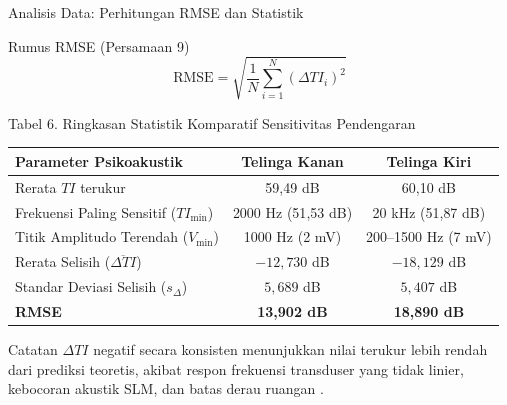 \documentclass[aspectratio=169, 10pt]{beamer}
\begin{document}
	\begin{frame}{Analisis Data: Perhitungan RMSE dan Statistik}
		\begin{block}{Rumus RMSE (Persamaan 9)}
			\begin{equation*}
				\text{RMSE} = \sqrt{\frac{1}{N}\sum_{i=1}^{N}(\Delta TI_i)^{2}}
			\end{equation*}
		\end{block}

		\begin{exampleblock}{Tabel 6. Ringkasan Statistik Komparatif Sensitivitas Pendengaran}
			\centering
			\vspace{0.1cm}
			\small
			\begin{tabular}{lcc}
				\toprule
				\textbf{Parameter Psikoakustik} & \textbf{Telinga Kanan} & \textbf{Telinga Kiri} \\
				\midrule
				Rerata $TI$ terukur & 59{,}49 dB & 60{,}10 dB \\
				Frekuensi Paling Sensitif ($TI_{\min}$) & 2000 Hz (51{,}53 dB) & 20 kHz (51{,}87 dB) \\
				Titik Amplitudo Terendah ($V_{\min}$) & 1000 Hz (2 mV) & 200--1500 Hz (7 mV) \\
				Rerata Selisih ($\overline{\Delta TI}$) & $-12{,}730$ dB & $-18{,}129$ dB \\
				Standar Deviasi Selisih ($s_{\Delta}$) & $5{,}689$ dB & $5{,}407$ dB \\
				\textbf{RMSE} & \textbf{13{,}902 dB} & \textbf{18{,}890 dB} \\
				\bottomrule
			\end{tabular}
		\end{exampleblock}

		\begin{block}{Catatan}
			\footnotesize
			$\Delta TI$ negatif secara konsisten menunjukkan nilai terukur lebih rendah dari prediksi teoretis, akibat respon frekuensi transduser yang tidak linier, kebocoran akustik SLM, dan batas derau ruangan \parencite{timdosen2026}.
		\end{block}
	\end{frame}
\end{document}
